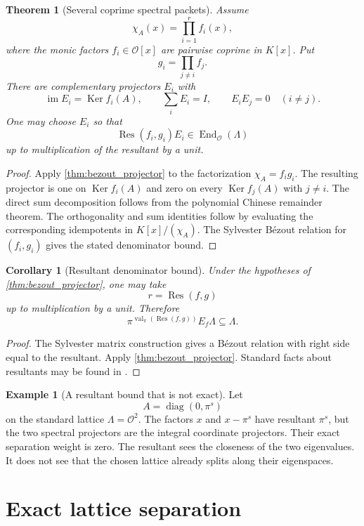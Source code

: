 \documentclass{aomart}
\newtheorem{theorem}{Theorem}[section]
\newtheorem{corollary}[corollary]{Corollary}
\theoremstyle{definition}
\newtheorem{example}[example]{Example}
\theoremstyle{remark}
\newcommand{\OO}{\mathcal O}
\newcommand{\End}{\operatorname{End}}
\newcommand{\im}{\operatorname{im}}
\newcommand{\Ker}{\operatorname{Ker}}
\newcommand{\val}{\operatorname{val}}
\newcommand{\diag}{\operatorname{diag}}
\newcommand{\Res}{\operatorname{Res}}
\begin{document}
\begin{theorem}[Several coprime spectral packets]\label{thm:several_projectors}
Assume
\[
\chi_A(x)=\prod_{i=1}^rf_i(x),
\]
where the monic factors $f_i\in\OO[x]$ are pairwise coprime in $K[x]$.  Put
\[
g_i=\prod_{j\ne i}f_j.
\]
There are complementary projectors $E_i$ with
\[
\im E_i=\Ker f_i(A),
\qquad
\sum_iE_i=I,
\qquad
E_iE_j=0
\quad(i\ne j).
\]
One may choose $E_i$ so that
\[
\Res(f_i,g_i)E_i\in\End_{\OO}(\Lambda)
\]
up to multiplication of the resultant by a unit.
\end{theorem}

\begin{proof}
Apply \cref{thm:bezout_projector} to the factorization $\chi_A=f_ig_i$.  The resulting projector is one on $\Ker f_i(A)$ and zero on every $\Ker f_j(A)$ with $j\ne i$.  The direct sum decomposition follows from the polynomial Chinese remainder theorem.  The orthogonality and sum identities follow by evaluating the corresponding idempotents in $K[x]/(\chi_A)$.  The Sylvester Bézout relation for $(f_i,g_i)$ gives the stated denominator bound.
\end{proof}

\begin{corollary}[Resultant denominator bound]\label{cor:resultant_bound}
Under the hypotheses of \cref{thm:bezout_projector}, one may take
\[
r=\Res(f,g)
\]
up to multiplication by a unit.  Therefore
\[
\pi^{\val_\pi(\Res(f,g))}E_f\Lambda\subseteq\Lambda.
\]
\end{corollary}

\begin{proof}
The Sylvester matrix construction gives a Bézout relation with right side equal to the resultant.  Apply \cref{thm:bezout_projector}.  Standard facts about resultants may be found in \cite{Lang2002,GohbergLancasterRodman2009}.
\end{proof}

\begin{example}[A resultant bound that is not exact]\label{ex:loose_resultant}
Let
\[
A=\diag(0,\pi^s)
\]
on the standard lattice $\Lambda=\OO^2$.  The factors $x$ and $x-\pi^s$ have resultant $\pi^s$, but the two spectral projectors are the integral coordinate projectors.  Their exact separation weight is zero.  The resultant sees the closeness of the two eigenvalues.  It does not see that the chosen lattice already splits along their eigenspaces.
\end{example}

\section{Exact lattice separation}\label{sec:lattice}
\end{document}
